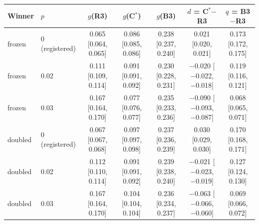 \begin{tabular}{llccccc}
\toprule
Winner & $p$ & $g$(R3) & $g$(C$^*$) & $g$(B3) & $d$ = C$^*$$-$R3 & $q$ = B3$-$R3 \\
\midrule
frozen & 0 (registered) & 0.065 [0.064, 0.065] & 0.086 [0.085, 0.086] & 0.238 [0.237, 0.240] & 0.021 [0.020, 0.021] & 0.173 [0.172, 0.175] \\
frozen & 0.02 & 0.111 [0.109, 0.114] & 0.091 [0.091, 0.092] & 0.230 [0.228, 0.231] & $-$0.020 [$-$0.022, $-$0.018] & 0.119 [0.116, 0.121] \\
frozen & 0.03 & 0.167 [0.164, 0.170] & 0.077 [0.076, 0.077] & 0.235 [0.233, 0.236] & $-$0.090 [$-$0.093, $-$0.087] & 0.068 [0.065, 0.071] \\
doubled & 0 (registered) & 0.067 [0.067, 0.068] & 0.097 [0.097, 0.098] & 0.237 [0.236, 0.239] & 0.030 [0.029, 0.030] & 0.170 [0.168, 0.171] \\
doubled & 0.02 & 0.112 [0.110, 0.114] & 0.091 [0.091, 0.092] & 0.239 [0.238, 0.240] & $-$0.021 [$-$0.023, $-$0.019] & 0.127 [0.124, 0.130] \\
doubled & 0.03 & 0.167 [0.164, 0.170] & 0.104 [0.104, 0.104] & 0.236 [0.234, 0.237] & $-$0.063 [$-$0.066, $-$0.060] & 0.069 [0.066, 0.072] \\
\bottomrule
\end{tabular}
